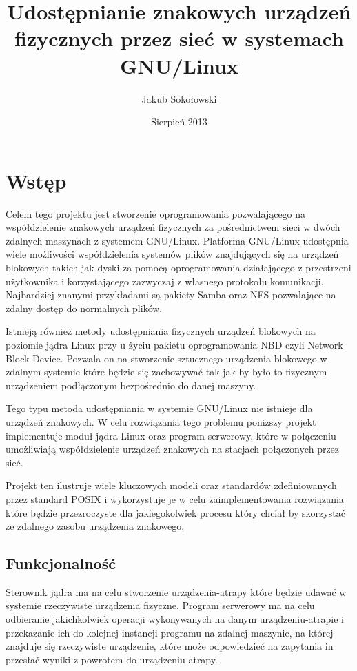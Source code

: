 \documentclass[10pt]{article}
\title{Udostępnianie znakowych urządzeń fizycznych przez sieć w systemach GNU/Linux}
\author{Jakub Sokołowski}
\date{Sierpień 2013}
\begin{document}
\newpage
\section{Wstęp}
\label{abstract}

Celem tego projektu jest stworzenie oprogramowania pozwalającego na współdzielenie znakowych urządzeń fizycznych za pośrednictwem sieci w dwóch zdalnych maszynach z systemem GNU/Linux. Platforma GNU/Linux udostępnia wiele możliwości współdzielenia systemów plików znajdujących się na urządzeń blokowych takich jak dyski za pomocą oprogramowania działającego z przestrzeni użytkownika i korzystającego zazwyczaj z własnego protokołu komunikacji. Najbardziej znanymi przykładami są pakiety Samba oraz NFS pozwalające na zdalny dostęp do normalnych plików.


Istnieją również metody udostępniania fizycznych urządzeń blokowych na poziomie jądra Linux przy u życiu pakietu oprogramowania NBD czyli Network Block Device. Pozwala on na stworzenie sztucznego urządzenia blokowego w zdalnym systemie które będzie się zachowywać tak jak by było to fizycznym urządzeniem podłączonym bezpośrednio do danej maszyny.

Tego typu metoda udostępniania w systemie GNU/Linux nie istnieje dla urządzeń znakowych. W celu rozwiązania tego problemu poniższy projekt implementuje moduł jądra Linux oraz program serwerowy, które w połączeniu umożliwiają współdzielenie urządzeń znakowych na stacjach połączonych przez sieć.

Projekt ten ilustruje wiele kluczowych modeli oraz standardów zdefiniowanych przez standard POSIX i wykorzystuje je w celu zaimplementowania rozwiązania które będzie przezroczyste dla jakiegokolwiek procesu który chciał by skorzystać ze zdalnego zasobu urządzenia znakowego.

\subsection{Funkcjonalność}
\label{functionality}

Sterownik jądra ma na celu stworzenie urządzenia-atrapy które będzie udawać w systemie rzeczywiste urządzenia fizyczne. Program serwerowy ma na celu odbieranie jakichkolwiek operacji wykonywanych na danym urządzeniu-atrapie i przekazanie ich do kolejnej instancji programu na zdalnej maszynie, na której znajduje się rzeczywiste urządzenie, które może odpowiedzieć na zapytania in przesłać wyniki z powrotem do urządzeniu-atrapy.
\end{document}
